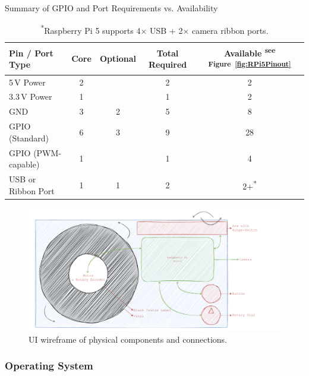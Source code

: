                 \begin{table}[htbp]
                    \centering
                    \caption{Summary of GPIO and Port Requirements vs. Availability}
                    \label{tab:pinSummary}
                    \begin{tabular}{|l|c|c|c|c|}
                        \hline
                        \textbf{Pin / Port Type} & \textbf{Core}& \textbf{Optional}& \textbf{Total Required} & \textbf{Available} \textsuperscript{see Figure~\ref{fig:RPi5Pinout}
    }}\\ \hline
                        5\,V Power & 2 & & 2 & 2 \\ \hline
                        3.3\,V Power & 1 & & 1& 2 \\ \hline
                        GND & 3 & 2 & 5 & 8 \\ \hline
                        GPIO (Standard) & 6 & 3 & 9 & 28 \\ \hline
                        GPIO (PWM-capable) & 1 & & 1 & 4 \\ \hline
                        USB or Ribbon Port & 1 & 1 & 2 & 2+\textsuperscript{*}\\ \hline
                    \end{tabular}
                    \caption*{\textsuperscript{*}Raspberry Pi 5 supports 4× USB + 2× camera ribbon ports.}
                \end{table}
    
                \begin{figure}[h]
                    \centering
                    \includegraphics[width=0.95\linewidth]{images/SketchPhys.pdf}
                    \caption{UI wireframe of physical components and connections.}
                    \label{fig:sketchPhys}
                \end{figure}
    
            \subsubsection{Operating System}
    
